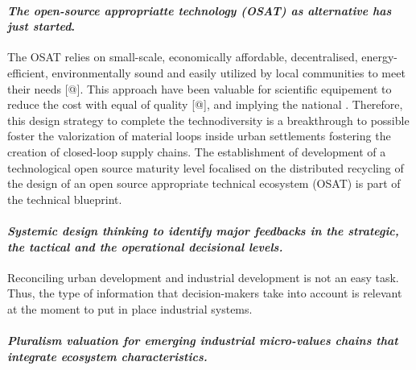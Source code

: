 \documentclass[
  11pt,
  a4paperpaper,
  onecolumn]{article}
\let\oldparagraph\paragraph
\renewcommand{\paragraph}[1]{\oldparagraph{#1}\mbox{}}
\let\paragraph\oldparagraph
\begin{document}
\hypertarget{the-open-source-appropriatte-technology-osat-as-alternative-has-just-started.}{%
\paragraph{\texorpdfstring{\emph{The open-source appropriatte technology
(OSAT) as alternative has just
started}.}{The open-source appropriatte technology (OSAT) as alternative has just started.}}\label{the-open-source-appropriatte-technology-osat-as-alternative-has-just-started.}}

The OSAT relies on small-scale, economically affordable, decentralised,
energy-efficient, environmentally sound and easily utilized by local
communities to meet their needs {[}@{]}. This approach have been
valuable for scientific equipement to reduce the cost with equal of
quality {[}@{]}, and implying the national . Therefore, this design
strategy to complete the technodiversity is a breakthrough to possible
foster the valorization of material loops inside urban settlements
fostering the creation of closed-loop supply chains. The establishment
of development of a technological open source maturity level focalised
on the distributed recycling of the design of an open source appropriate
technical ecosystem (OSAT) is part of the technical blueprint.

\hypertarget{systemic-design-thinking-to-identify-major-feedbacks-in-the-strategic-the-tactical-and-the-operational-decisional-levels.}{%
\paragraph{\texorpdfstring{\emph{Systemic design thinking to identify
major feedbacks in the strategic, the tactical and the operational
decisional
levels.}}{Systemic design thinking to identify major feedbacks in the strategic, the tactical and the operational decisional levels.}}\label{systemic-design-thinking-to-identify-major-feedbacks-in-the-strategic-the-tactical-and-the-operational-decisional-levels.}}

Reconciling urban development and industrial development is not an easy
task. Thus, the type of information that decision-makers take into
account is relevant at the moment to put in place industrial systems.

\hypertarget{pluralism-valuation-for-emerging-industrial-micro-values-chains-that-integrate-ecosystem-characteristics.}{%
\paragraph{\texorpdfstring{\emph{Pluralism valuation for emerging
industrial micro-values chains that integrate ecosystem
characteristics.}}{Pluralism valuation for emerging industrial micro-values chains that integrate ecosystem characteristics.}}\label{pluralism-valuation-for-emerging-industrial-micro-values-chains-that-integrate-ecosystem-characteristics.}}
\end{document}
